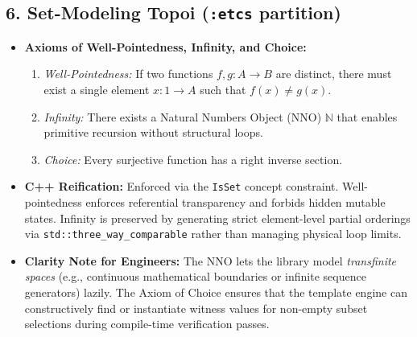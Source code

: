 \subsection{6. Set-Modeling Topoi (\texttt{:etcs} partition)}
\begin{itemize}
    \item \textbf{Axioms of Well-Pointedness, Infinity, and Choice:}
    \begin{enumerate}
        \item \textit{Well-Pointedness:} If two functions $f, g: A \to B$ are distinct, there must exist a single element $x: 1 \to A$ such that $f(x) \neq g(x)$.
        \item \textit{Infinity:} There exists a Natural Numbers Object (NNO) $\mathbb{N}$ that enables primitive recursion without structural loops.
        \item \textit{Choice:} Every surjective function has a right inverse section.
    \end{enumerate}
    \item \textbf{C++ Reification:} Enforced via the \texttt{IsSet} concept constraint. Well-pointedness enforces referential transparency and forbids hidden mutable states. Infinity is preserved by generating strict element-level partial orderings via \texttt{std::three\_way\_comparable} rather than managing physical loop limits.
    \item \textbf{Clarity Note for Engineers:} The NNO lets the library model \textit{transfinite spaces} (e.g., continuous mathematical boundaries or infinite sequence generators) lazily. The Axiom of Choice ensures that the template engine can constructively find or instantiate witness values for non-empty subset selections during compile-time verification passes.
\end{itemize}


